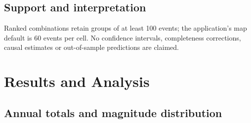 \documentclass[11pt,a4paper]{article}
\begin{document}
\subsection{Support and interpretation}
Ranked combinations retain groups of at least 100 events; the application's map default is 60 events per cell. No confidence intervals, completeness corrections, causal estimates or out-of-sample predictions are claimed.

\section{Results and Analysis}
\subsection{Annual totals and magnitude distribution}
\end{document}
